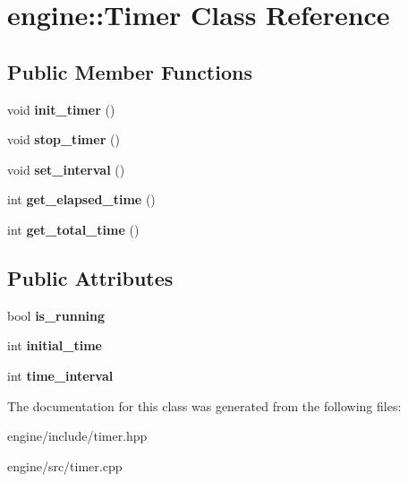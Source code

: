\hypertarget{classengine_1_1_timer}{}\section{engine\+:\+:Timer Class Reference}
\label{classengine_1_1_timer}
\subsection*{Public Member Functions}
\begin{DoxyCompactItemize}
\item 
void {\bfseries init\+\_\+timer} ()\hypertarget{classengine_1_1_timer_a45123e6a818705f7f960c641a31e1b86}{}\label{classengine_1_1_timer_a45123e6a818705f7f960c641a31e1b86}

\item 
void {\bfseries stop\+\_\+timer} ()\hypertarget{classengine_1_1_timer_ac05cde2d44f1a1fc40554bf78a65fe0e}{}\label{classengine_1_1_timer_ac05cde2d44f1a1fc40554bf78a65fe0e}

\item 
void {\bfseries set\+\_\+interval} ()\hypertarget{classengine_1_1_timer_a230de9674796b8c15ec41a13f772f330}{}\label{classengine_1_1_timer_a230de9674796b8c15ec41a13f772f330}

\item 
int {\bfseries get\+\_\+elapsed\+\_\+time} ()\hypertarget{classengine_1_1_timer_aeb59bd6b4bb8d26575cb81a9164bd333}{}\label{classengine_1_1_timer_aeb59bd6b4bb8d26575cb81a9164bd333}

\item 
int {\bfseries get\+\_\+total\+\_\+time} ()\hypertarget{classengine_1_1_timer_ab5d8002dd5e97d720d5c1d11fcdf315f}{}\label{classengine_1_1_timer_ab5d8002dd5e97d720d5c1d11fcdf315f}

\end{DoxyCompactItemize}
\subsection*{Public Attributes}
\begin{DoxyCompactItemize}
\item 
bool {\bfseries is\+\_\+running}\hypertarget{classengine_1_1_timer_a4edcb72b4902b9bcb992951bea4d2d4b}{}\label{classengine_1_1_timer_a4edcb72b4902b9bcb992951bea4d2d4b}

\item 
int {\bfseries initial\+\_\+time}\hypertarget{classengine_1_1_timer_ad6808d2e796d7781fa749fdc9b0436e9}{}\label{classengine_1_1_timer_ad6808d2e796d7781fa749fdc9b0436e9}

\item 
int {\bfseries time\+\_\+interval}\hypertarget{classengine_1_1_timer_ab893c290a2c3e8d0244fa5f3e072547d}{}\label{classengine_1_1_timer_ab893c290a2c3e8d0244fa5f3e072547d}

\end{DoxyCompactItemize}


The documentation for this class was generated from the following files\+:\begin{DoxyCompactItemize}
\item 
engine/include/timer.\+hpp\item 
engine/src/timer.\+cpp\end{DoxyCompactItemize}
